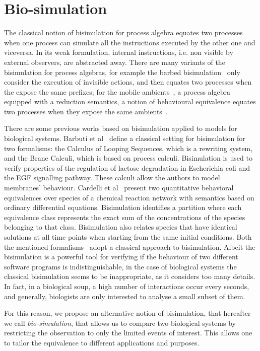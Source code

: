 \section{Bio-simulation}
\label{sec:biosimulation}

The classical notion of bisimulation for process algebra equates two processes
when one process can simulate all the instructions executed by the other one and viceversa.
In its weak formulation, internal instructions, i.e. non visible by external observers,
are abstracted away. 
There are many variants of the bisimulation for process algebras,  for example the
barbed bisimulation~\cite{10.1007/3-540-55719-9_114} only consider the execution of invisible actions, and then equates two processes when the expose the same prefixes; for the mobile ambients~\cite{CardelliG00}, a process algebra equipped with a reduction semantics, a notion of
behavioural equivalence equates two processes when they expose the same ambients~\cite{GC03}. 

There are some previous works based on bisimulation applied to models for biological systems. Barbuti et al~\cite{BMMT08} define a classical setting for bisimulation for two formalisms: the Calculus of Looping Sequences, which is a rewriting system, and the Brane Calculi, which is based on process calculi.
Bisimulation is used to verify properties of the regulation of lactose degradation in
Escherichia coli and the EGF signalling pathway. These calculi allow the authors to model membranes' behaviour.
Cardelli et al~\cite{CTTV15} present two quantitative behavioral equivalences over species of a 
chemical reaction network with semantics based on ordinary differential equations.
Bisimulation identifies a partition where each equivalence class represents the exact sum of the concentrations of the species belonging to that class.
Bisimulation also relates species that have identical solutions at all time points when starting from the same initial conditions.
Both the mentioned formalisms~\cite{BMMT08,CTTV15} adopt a classical approach to bisimulation. 
Albeit the bisimulation is a powerful tool for verifying if the behaviour of two different software 
programs is indistinguishable, in the case of biological systems the classical bisimulation seems to be inappropriate, as it considers too many details.
In fact, in a biological soup, a high number of interactions occur every seconds, and generally, biologists
are only interested to analyse a small subset of them.

For this reason, we propose an alternative notion of bisimulation, that hereafter we call \emph{bio-simulation},
that allows us  to compare two biological systems by restricting the observation to only the limited events of interest.
This allows one to tailor the equivalence to different applications and purposes. 

